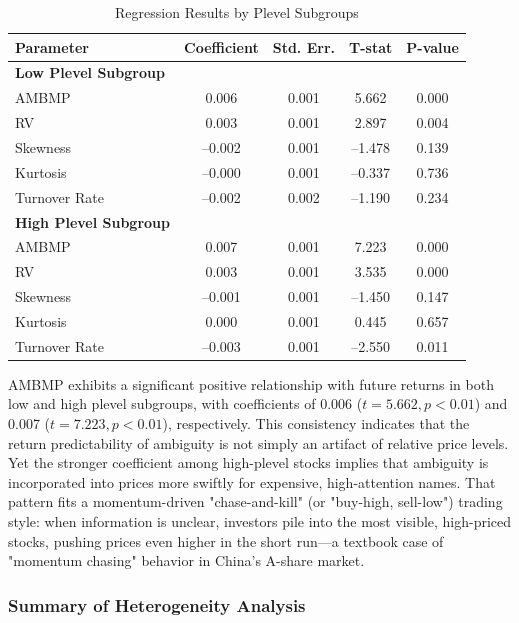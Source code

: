 \documentclass[preprint,12pt,authoryear]{elsarticle}
\begin{document}
\begin{table}[h!]
\centering
\caption{Regression Results by Plevel Subgroups}
\label{tab:plevel_subgroup_results}
\begin{tabular}{lcccc}
\toprule
\textbf{Parameter} & \textbf{Coefficient} & \textbf{Std. Err.} & \textbf{T-stat} & \textbf{P-value} \\
\midrule
\textbf{Low Plevel Subgroup} & & & & \\
AMBMP & 0.006 & 0.001 & 5.662 & 0.000 \\
RV & 0.003 & 0.001 & 2.897 & 0.004 \\
Skewness & –0.002 & 0.001 & –1.478 & 0.139 \\
Kurtosis & –0.000 & 0.001 & –0.337 & 0.736 \\
Turnover Rate & –0.002 & 0.002 & –1.190 & 0.234 \\
\midrule
\textbf{High Plevel Subgroup} & & & & \\
AMBMP & 0.007 & 0.001 & 7.223 & 0.000 \\
RV & 0.003 & 0.001 & 3.535 & 0.000 \\
Skewness & –0.001 & 0.001 & –1.450 & 0.147 \\
Kurtosis & 0.000 & 0.001 & 0.445 & 0.657 \\
Turnover Rate & –0.003 & 0.001 & –2.550 & 0.011 \\
\bottomrule
\end{tabular}
\end{table}

AMBMP exhibits a significant positive relationship with future returns in both low and high plevel subgroups, with coefficients of 0.006 ($t = 5.662, p < 0.01$) and 0.007 ($t = 7.223, p < 0.01$), respectively. This consistency indicates that the return predictability of ambiguity is not simply an artifact of relative price levels. Yet the stronger coefficient among high-plevel stocks implies that ambiguity is incorporated into prices more swiftly for expensive, high-attention names. That pattern fits a momentum-driven "chase-and-kill" (or "buy-high, sell-low") trading style: when information is unclear, investors pile into the most visible, high-priced stocks, pushing prices even higher in the short run—a textbook case of "momentum chasing" behavior in China's A-share market.

\subsubsection{Summary of Heterogeneity Analysis}
\end{document}
